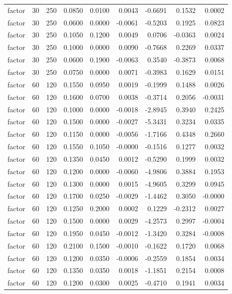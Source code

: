 \begin{tabular}{lrrrrrrrr}
factor & 30 & 250 & 0.0850 & 0.0100 & 0.0043 & -0.6691 & 0.1532 & 0.0002 \\
factor & 30 & 250 & 0.0600 & 0.0000 & -0.0061 & -0.5203 & 0.1925 & 0.0823 \\
factor & 30 & 250 & 0.1050 & 0.1200 & 0.0049 & 0.0706 & -0.0363 & 0.0024 \\
factor & 30 & 250 & 0.1000 & 0.0000 & 0.0090 & -0.7668 & 0.2269 & 0.0337 \\
factor & 30 & 250 & 0.0600 & 0.1900 & -0.0063 & 0.3540 & -0.3873 & 0.0068 \\
factor & 30 & 250 & 0.0750 & 0.0000 & 0.0071 & -0.3983 & 0.1629 & 0.0151 \\
factor & 60 & 120 & 0.1550 & 0.0950 & 0.0019 & -0.1999 & 0.1488 & 0.0026 \\
factor & 60 & 120 & 0.1600 & 0.0700 & 0.0038 & -0.3714 & 0.2056 & -0.0031 \\
factor & 60 & 120 & 0.1000 & 0.0000 & -0.0018 & -2.8945 & 0.3940 & 0.2425 \\
factor & 60 & 120 & 0.1500 & 0.0000 & -0.0027 & -5.3431 & 0.3234 & 0.0335 \\
factor & 60 & 120 & 0.1150 & 0.0000 & -0.0056 & -1.7166 & 0.4348 & 0.2660 \\
factor & 60 & 120 & 0.1550 & 0.1050 & -0.0000 & -0.1516 & 0.1277 & 0.0032 \\
factor & 60 & 120 & 0.1350 & 0.0450 & 0.0012 & -0.5290 & 0.1999 & 0.0032 \\
factor & 60 & 120 & 0.1200 & 0.0000 & -0.0060 & -4.9806 & 0.3884 & 0.1953 \\
factor & 60 & 120 & 0.1300 & 0.0000 & 0.0015 & -4.9605 & 0.3299 & 0.0945 \\
factor & 60 & 120 & 0.1700 & 0.0250 & -0.0029 & -1.4462 & 0.3050 & -0.0000 \\
factor & 60 & 120 & 0.1250 & 0.2000 & 0.0002 & 0.1229 & -0.2312 & 0.0027 \\
factor & 60 & 120 & 0.1500 & 0.0000 & 0.0029 & -4.2573 & 0.2997 & -0.0004 \\
factor & 60 & 120 & 0.1950 & 0.0450 & -0.0012 & -1.3420 & 0.3284 & -0.0008 \\
factor & 60 & 120 & 0.2100 & 0.1500 & -0.0010 & -0.1622 & 0.1720 & 0.0068 \\
factor & 60 & 120 & 0.1200 & 0.0350 & -0.0006 & -0.2559 & 0.1854 & 0.0034 \\
factor & 60 & 120 & 0.1350 & 0.0350 & 0.0018 & -1.1851 & 0.2154 & 0.0008 \\
factor & 60 & 120 & 0.1200 & 0.0300 & 0.0025 & -0.4710 & 0.1941 & 0.0034 \\

\end{tabular}
